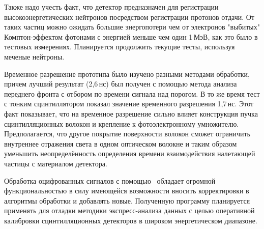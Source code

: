 Также надо учесть факт, что детектор предназначен для регистрации высокоэнергетических нейтронов посредством регистрации протонов отдачи. От таких частиц можно ожидать большие энергопотери чем от электронов "выбитых" Комптон-эффектом фотонами с энергией меньше чем один 1\,МэВ, как это было в тестовых измерениях. Планируется продолжить текущие тесты, используя меченые нейтроны.

Временное разрешение прототипа было изучено разными методами обработки, причем лучший результат (2,6\,нс) был получен с помощью метода анализа переднего фронта с отбором по времени сигнала над порогом. В то же время тест с тонким сцинтиллятором показал значение временного разрешения 1,7\,нс. Этот факт показывает, что на временное разрешение сильно влияет конструкция пучка сцинтилляционных волокон и крепление к фотоэлектронному умножителю. Предполагается, что другое покрытие поверхности волокон сможет ограничить внутреннее отражения света в одном оптическом волокне и таким образом уменьшить неопределённость определения времени взаимодействия налетающей частицы с материалом детектора.

Обработка оцифрованных сигналов с помощью \er\ обладает огромной функциональностью в силу имеющейся возможности вносить корректировки в алгоритмы обработки и добавлять новые. Полученную программу планируется применять для отладки методики экспресс-анализа данных с целью оперативной калибровки сцинтилляционных детекторов в широком энергетическом диапазоне.

%
%
%
